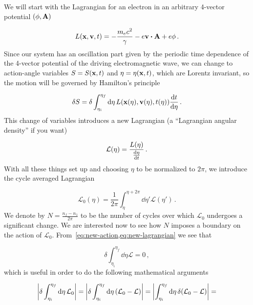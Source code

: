 \documentclass[12pt, class=report, crop=false]{standalone}
\begin{document}
We will start with the Lagrangian for an electron in an arbitrary 4-vector potential \((\phi,\vb{A})\)

\begin{equation}
  \label{eq:lagrangian-0}
  L(\vb{x},\vb{v},t) = -\frac{m_e c^2}{\gamma} - e\vb{v}\vdot\vb{A} + e \phi\,.
\end{equation}
Since our system has an oscillation part given by the periodic time dependence of the 4-vector potential of the driving electromagnetic wave, we can change to action-angle variables \(S=S(\vb{x},t)\) and \(\eta = \eta (\vb{x},t)\), which are Lorentz invariant, so the motion will be governed by Hamilton's principle

\begin{equation}
  \label{eq:new-action}
  \delta S = \delta \int_{\eta_i}^{\eta_f} \dd{\eta} L(\vb{x}(\eta),\vb{v}(\eta),t(\eta)) \dv{t}{\eta}\,.
\end{equation}
This change of variables introduces a new Lagrangian (a ``Lagrangian angular density'' if you want)

\begin{equation}
  \label{eq:new-lagrangian}
  \mathcal{L} (\eta) = \frac{L(\eta)}{\dv{\eta}{t}}\,.
\end{equation}
With all these things set up and choosing \(\eta\) to be normalized to \(2\pi\), we introduce the cycle averaged Lagrangian

\begin{equation}
  \label{eq:cycle-avg-lagrangian}
  \mathcal{L}_0 (\eta) = \frac{1}{2\pi} \int_\eta^{\eta+2\pi} \dd{\eta'} \mathcal{L} (\eta')\,.
\end{equation}
We denote by \(N = \frac{n_f-n_1}{2\pi}\) to be the number of cycles over which \(\mathcal{L}_0\) undergoes a significant change. We are interested now to see how \(N\) imposes a boundary on the action of \(\mathcal{L}_0\). From~\cref{eq:new-action,eq:new-lagrangian} we see that

\begin{equation*}
  \delta \int_{\eta_i}^{\eta_f} \dd{\eta} \mathcal{L} = 0\,,
\end{equation*}
which is useful in order to do the following mathematical arguments

\begin{equation*}
  \abs{\delta \int_{\eta_i}^{\eta_f} \dd{\eta} \mathcal{L}_0} = \abs{\delta \int_{\eta_i}^{\eta_f} \dd{\eta} (\mathcal{L}_0 - \mathcal{L})} = \abs{\int_{\eta_i}^{\eta_f} \dd{\eta} \delta (\mathcal{L}_0 - \mathcal{L})} =
\end{equation*}
\end{document}
